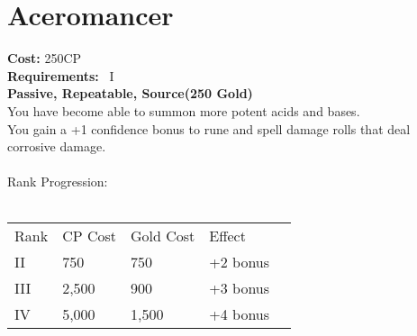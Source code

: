 \section{Aceromancer}\label{perk:aceromancer}
\textbf{Cost:} 250CP\\
\textbf{Requirements:}~ I\\
\textbf{Passive, Repeatable, Source(250 Gold)}\\
You have become able to summon more potent acids and bases.\\
You gain a +1 confidence bonus to rune and spell damage rolls that deal corrosive damage.\\
\\
Rank Progression:\\
\\
\begin{longtable}{l | l | l | l | l}
    Rank & CP Cost & Gold Cost &  Effect\\
    II & 750 & 750 & +2 bonus\\
    III & 2,500 & 900 & +3 bonus\\
    IV & 5,000 & 1,500 & +4 bonus\\
\end{longtable}